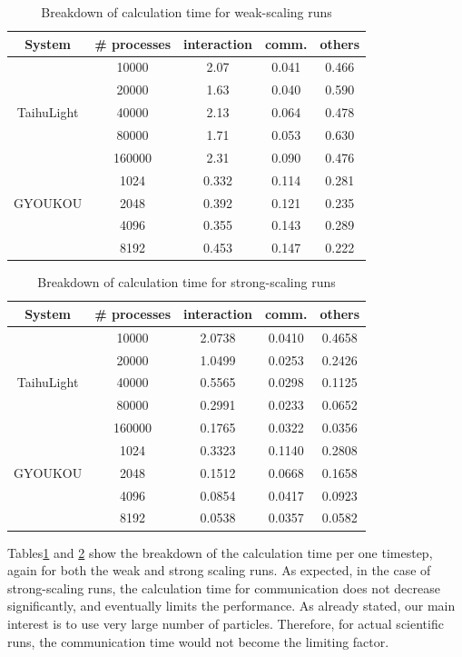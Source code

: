 \documentclass[conference]{IEEEtran}
\begin{document}
\begin{table}
\centering
  \caption{Breakdown of calculation time for weak-scaling runs}
  \label{tab:timeweak}
  \begin{tabular}{ccccc}
    \hline
 System  & \# processes & interaction & comm. & others\\
    \hline  
&10000 &   2.07& 0.041 & 0.466\\
&20000 &  1.63& 0.040  & 0.590 \\
TaihuLight &40000  &  2.13 & 0.064 & 0.478 \\
&80000 &   1.71 & 0.053 & 0.630\\
&160000 &  2.31& 0.090& 0.476\\
\hline
&1024&  0.332 &  0.114 & 0.281\\
GYOUKOU &2048&   0.392 & 0.121 & 0.235\\
&4096&  0.355 & 0.143& 0.289\\
&8192   & 0.453& 0.147&     0.222\\
\hline
\end{tabular}
\end{table}

\begin{table}
\centering
  \caption{Breakdown of calculation time for strong-scaling runs}
  \label{tab:timestrong}
  \begin{tabular}{ccccc}
    \hline
 System  & \# processes & interaction & comm. & others\\
    \hline  
& 10000& 2.0738 & 0.0410 & 0.4658 \\
& 20000& 1.0499 & 0.0253 & 0.2426 \\
TaihuLight & 40000& 0.5565 & 0.0298 & 0.1125 \\
& 80000& 0.2991 & 0.0233 & 0.0652 \\
& 160000& 0.1765 & 0.0322 & 0.0356 \\
\hline
& 1024& 0.3323 & 0.1140 & 0.2808 \\
GYOUKOU & 2048& 0.1512 & 0.0668 & 0.1658 \\
& 4096& 0.0854 & 0.0417 & 0.0923 \\
& 8192& 0.0538 & 0.0357 & 0.0582 \\
    \hline  
\end{tabular}
\end{table}
 
Tables\ref{tab:timeweak} and \ref{tab:timestrong} show the breakdown
of the calculation time per one timestep, again for both the weak and
strong scaling runs. As expected, in the case of strong-scaling runs,
the calculation time for communication does not decrease
significantly, and eventually limits the performance.  As already
stated, our main interest is to use very large number of
particles. Therefore, for actual scientific runs, the communication
time would not become the limiting factor.
\end{document}
